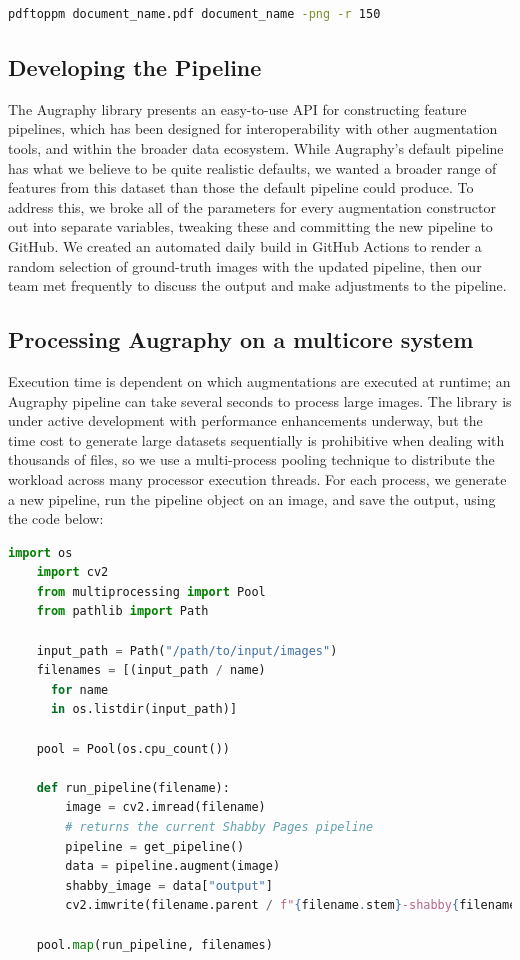 \documentclass[runningheads]{llncs}
\begin{document}
\begin{lstlisting}[language=bash]
  pdftoppm document_name.pdf document_name -png -r 150
\end{lstlisting}

\subsection{Developing the Pipeline}
The Augraphy library presents an easy-to-use API for constructing feature pipelines, which has been designed for interoperability with other augmentation tools, and within the broader data ecosystem.
While Augraphy's default pipeline has what we believe to be quite realistic defaults, we wanted a broader range of features from this dataset than those the default pipeline could produce.
To address this, we broke all of the parameters for every augmentation constructor out into separate variables, tweaking these and committing the new pipeline to GitHub.
We created an automated daily build in GitHub Actions to render a random selection of ground-truth images with the updated pipeline, then our team met frequently to discuss the output and make adjustments to the pipeline.

\subsection{Processing Augraphy on a multicore system}
Execution time is dependent on which augmentations are executed at runtime; an Augraphy pipeline can take several seconds to process large images.
The library is under active development with performance enhancements underway, but the time cost to generate large datasets sequentially is prohibitive when dealing with thousands of files, so we use a multi-process pooling technique to distribute the workload across many processor execution threads.
For each process, we generate a new pipeline, run the pipeline object on an image, and save the output, using the code below:

\begin{lstlisting}[language=Python]
    import os
    import cv2
    from multiprocessing import Pool
    from pathlib import Path

    input_path = Path("/path/to/input/images")
    filenames = [(input_path / name)
      for name
      in os.listdir(input_path)]

    pool = Pool(os.cpu_count())

    def run_pipeline(filename):
        image = cv2.imread(filename)
        # returns the current Shabby Pages pipeline
        pipeline = get_pipeline()
        data = pipeline.augment(image)
        shabby_image = data["output"]
        cv2.imwrite(filename.parent / f"{filename.stem}-shabby{filename.suffix}")

    pool.map(run_pipeline, filenames)

\end{lstlisting}
\end{document}

